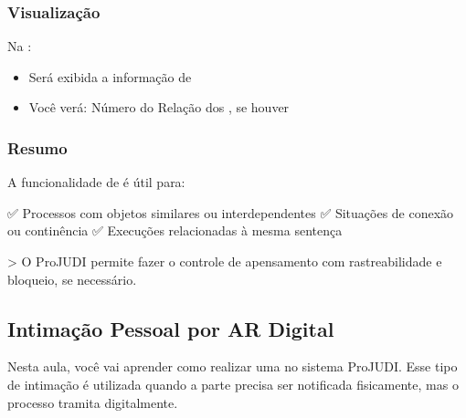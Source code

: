 \documentclass[letterpaper,10pt,brazil]{sphinxmanual}
\begin{document}
\subsubsection{Visualização}
\label{\detokenize{projud_28_apensamentos:visualizacao}}
\sphinxAtStartPar
Na :
\begin{itemize}
\item {} 
\sphinxAtStartPar
Será exibida a informação de 

\item {} 
\sphinxAtStartPar
Você verá:
\sphinxhyphen{} Número do 
\sphinxhyphen{} Relação dos , se houver

\end{itemize}


\subsubsection{Resumo}
\label{\detokenize{projud_28_apensamentos:resumo}}
\sphinxAtStartPar
A funcionalidade de  é útil para:

\sphinxAtStartPar
✅ Processos com objetos similares ou interdependentes
✅ Situações de conexão ou continência
✅ Execuções relacionadas à mesma sentença

\sphinxAtStartPar
\textgreater{} O ProJUDI permite fazer o controle de apensamento com rastreabilidade e bloqueio, se necessário.

\sphinxstepscope


\subsection{Intimação Pessoal por AR Digital}
\label{\detokenize{projud_29_intimacaoARdigital:intimacao-pessoal-por-ar-digital}}\label{\detokenize{projud_29_intimacaoARdigital::doc}}
\sphinxAtStartPar
Nesta aula, você vai aprender como realizar uma  no sistema ProJUDI. Esse tipo de intimação é utilizada quando a parte precisa ser notificada fisicamente, mas o processo tramita digitalmente.
\end{document}
